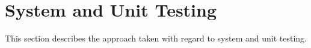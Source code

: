 
\chapter{System  and Unit Testing}
This section describes the approach taken with regard to system and unit testing. 

